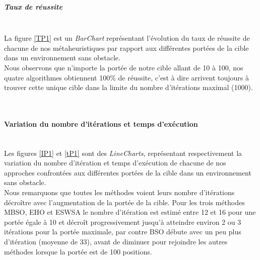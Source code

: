 \hspace{-0.5cm}
\begin{minipage}[t]{0.5\textwidth}
	\subparagraph{Taux de réussite}
	\textbf{  }\\
	
	La figure \ref{TP1} est un \textit{BarChart} représentant l'évolution du taux de réussite de chacune de nos métaheuristiques par rapport aux différentes portées de la cible dans un environnement sans obstacle.\\
	 
	Nous observons que n'importe la portée de notre cible allant de 10 à 100, nos quatre algorithmes obtiennent 100\% de réussite, c'est à dire arrivent toujours à trouver cette unique cible 
	dans la limite du nombre d'itérations maximal (1000).
	
\end{minipage}\hfill
\begin{minipage}[t]{0.55\textwidth}
	\captionsetup{width=0.8\linewidth}
	\centering{}
	\vspace{-0.3cm}
	\label{TP1}
\end{minipage}\hfill

\textbf{ }\\

\noindent
\paragraph{Variation du nombre d'itérations et temps d'exécution}
\textbf{ }\\

Les figures \ref{IP1} et \ref{tP1} sont des \textit{LineCharts}, représentant respectivement la variation du nombre d'itération et temps d'exécution de chacune de nos approches confrontées aux différentes portées de la cible dans un environnement sans obstacle.\\

Nous remarquons que toutes les méthodes voient leurs nombre d'itérations décroître avec l'augmentation de la portée de la cible. Pour les trois méthodes MBSO, EHO et ESWSA le nombre d'itération est estimé entre 12 et 16 pour une portée égale à 10 et décroît progressivement jusqu'à atteindre environ 2 ou 3 itérations pour la portée maximale, par contre BSO débute avec un peu plus d'itération (moyenne de 33), avant de diminuer pour rejoindre les autres méthodes lorsque la portée est de 100 positions.\\

